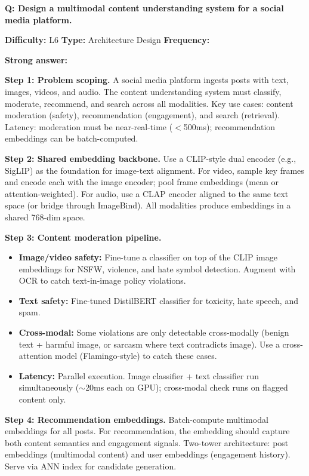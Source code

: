 \begin{interviewq}
\textbf{Q: Design a multimodal content understanding system for a social media platform.}

\textbf{Difficulty:} L6 \quad \textbf{Type:} Architecture Design \quad \textbf{Frequency:} \freqhigh{}

\textbf{Strong answer:}

\textbf{Step 1: Problem scoping.} A social media platform ingests posts with text, images, videos, and audio. The content understanding system must classify, moderate, recommend, and search across all modalities. Key use cases: content moderation (safety), recommendation (engagement), and search (retrieval). Latency: moderation must be near-real-time ($<$500ms); recommendation embeddings can be batch-computed.

\textbf{Step 2: Shared embedding backbone.} Use a CLIP-style dual encoder (e.g., SigLIP) as the foundation for image-text alignment. For video, sample key frames and encode each with the image encoder; pool frame embeddings (mean or attention-weighted). For audio, use a CLAP encoder aligned to the same text space (or bridge through ImageBind). All modalities produce embeddings in a shared 768-dim space.

\textbf{Step 3: Content moderation pipeline.}
\begin{itemize}
    \item \textbf{Image/video safety:} Fine-tune a classifier on top of the CLIP image embeddings for NSFW, violence, and hate symbol detection. Augment with OCR to catch text-in-image policy violations.
    \item \textbf{Text safety:} Fine-tuned DistilBERT classifier for toxicity, hate speech, and spam.
    \item \textbf{Cross-modal:} Some violations are only detectable cross-modally (benign text + harmful image, or sarcasm where text contradicts image). Use a cross-attention model (Flamingo-style) to catch these cases.
    \item \textbf{Latency:} Parallel execution. Image classifier + text classifier run simultaneously ($\sim$20ms each on GPU); cross-modal check runs on flagged content only.
\end{itemize}

\textbf{Step 4: Recommendation embeddings.} Batch-compute multimodal embeddings for all posts. For recommendation, the embedding should capture both content semantics and engagement signals. Two-tower architecture: post embeddings (multimodal content) and user embeddings (engagement history). Serve via ANN index for candidate generation.


\end{interviewq}
